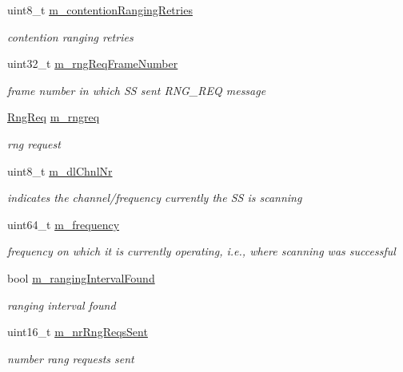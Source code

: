 \begin{DoxyCompactItemize}
uint8\+\_\+t \hyperlink{classns3_1_1SSLinkManager_a4cc5616652cf22b6d194bcbc85966bcb}{m\+\_\+contention\+Ranging\+Retries}
\begin{DoxyCompactList}\small\item\em contention ranging retries \end{DoxyCompactList}\item 
uint32\+\_\+t \hyperlink{classns3_1_1SSLinkManager_aa1819c668290b52001071139ed22374a}{m\+\_\+rng\+Req\+Frame\+Number}
\begin{DoxyCompactList}\small\item\em frame number in which SS sent R\+N\+G\+\_\+\+R\+EQ message \end{DoxyCompactList}\item 
\hyperlink{classns3_1_1RngReq}{Rng\+Req} \hyperlink{classns3_1_1SSLinkManager_a3529ea909c47514bd720211fb5bb3702}{m\+\_\+rngreq}
\begin{DoxyCompactList}\small\item\em rng request \end{DoxyCompactList}\item 
uint8\+\_\+t \hyperlink{classns3_1_1SSLinkManager_abc85be3e99ffd493514b3f71617e795a}{m\+\_\+dl\+Chnl\+Nr}
\begin{DoxyCompactList}\small\item\em indicates the channel/frequency currently the SS is scanning \end{DoxyCompactList}\item 
uint64\+\_\+t \hyperlink{classns3_1_1SSLinkManager_a7b09219cd63013f994d264cf0dcaa485}{m\+\_\+frequency}
\begin{DoxyCompactList}\small\item\em frequency on which it is currently operating, i.\+e., where scanning was successful \end{DoxyCompactList}\item 
bool \hyperlink{classns3_1_1SSLinkManager_af9360b36a73b271142c02ca45eb8f696}{m\+\_\+ranging\+Interval\+Found}
\begin{DoxyCompactList}\small\item\em ranging interval found \end{DoxyCompactList}\item 
uint16\+\_\+t \hyperlink{classns3_1_1SSLinkManager_a28fe764252091022ad2f4fc1ae8a0cbc}{m\+\_\+nr\+Rng\+Reqs\+Sent}
\begin{DoxyCompactList}\small\item\em number rang requests sent \end{DoxyCompactList}\item 

\end{DoxyCompactItemize}
